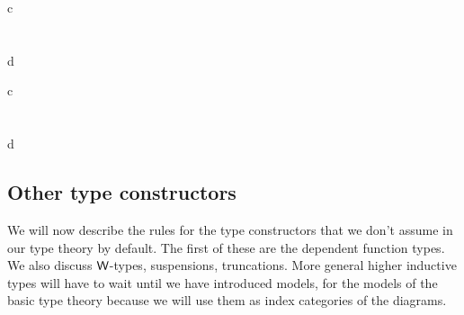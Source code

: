 \begin{infarray}{c}
\inference{\jctx{\Gamma}}{\jtype{\ctxext{\Gamma}{\ctxwk{\Gamma}{\Gamma}}}{\idtypevar{\Gamma}}}\\
\\
           {}\\
{\jtermeq
  {\ctxext{{\Gamma}{\ctxwk{\Gamma}{\Gamma}}}{\idtypevar{\Gamma}}}
  {}
  {}
  {d}}
\end{infarray}

\begin{infarray}{c}
\\
\\
{}\\
{\jtermeq
  {}
  {}
  {}
  {d}}
\end{infarray}

\subsection{Other type constructors}
We will now describe the rules for the type constructors that we don't assume
in our type theory by default. The first of these are the dependent function
types. We also discuss $\mathsf{W}$-types, suspensions, truncations. More general higher inductive
types will have to wait until we have introduced models, for the models of the
basic type theory because we will use them as index categories of the diagrams.

